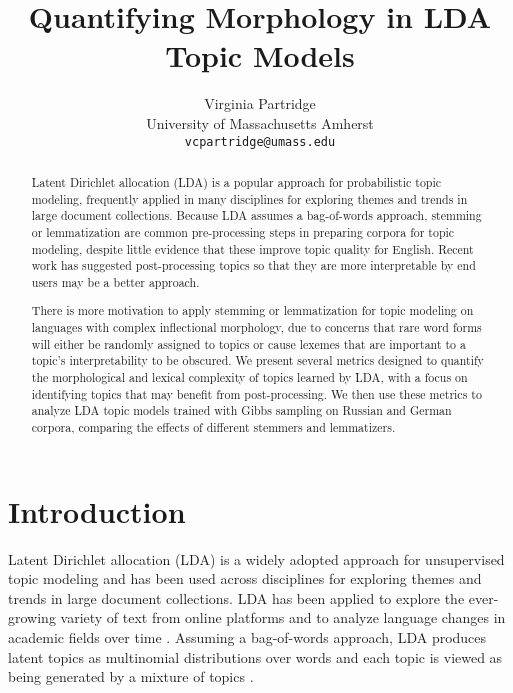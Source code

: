 \documentclass[11pt,a4paper]{article}
\title{Quantifying Morphology in LDA Topic Models}
\author{Virginia Partridge \\
  University of Massachusetts Amherst\\
  \texttt{vcpartridge@umass.edu}
}
\date{}
\begin{document}
\maketitle
\begin{abstract}
    Latent Dirichlet allocation (LDA) is a popular approach for probabilistic topic modeling, frequently applied in many disciplines for exploring themes and trends in large document collections. Because LDA assumes a bag-of-words approach, stemming or lemmatization are common pre-processing steps in preparing corpora for topic modeling, despite little evidence that these improve topic quality for English. Recent work has suggested post-processing topics so that they are more interpretable by end users may be a better approach.

    There is more motivation to apply stemming or lemmatization for topic modeling on languages with complex inflectional morphology, due to concerns that rare word forms will either be randomly assigned to topics or cause lexemes that are important to a topic's interpretability to be obscured.
    We present several metrics designed to quantify the morphological and lexical complexity of topics learned by LDA, with a focus on identifying topics that may benefit from post-processing. We then use these metrics to analyze LDA topic models trained with Gibbs sampling on Russian and German corpora, comparing the effects of different stemmers and lemmatizers.
\end{abstract}

\section{Introduction}
Latent Dirichlet allocation (LDA) is a widely adopted approach for unsupervised topic modeling and has been used across disciplines for exploring themes and trends in large document collections. LDA has been applied to explore the ever-growing variety of text from online platforms and to analyze language changes in academic fields over time \cite{koltsova2013,mcfarland2013differentiating, vogel-jurafsky-2012-said, mitrofanova2015probabilistic}. Assuming a bag-of-words approach, LDA produces latent topics as multinomial distributions over words and each topic is viewed as being generated by a mixture of topics \cite{blei2003,steyvers2007probabilistic}.
\end{document}

